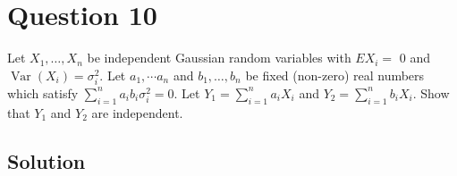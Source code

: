 \section*{Question 10}

Let \( X_{1}, \dots, X_{n} \) be independent Gaussian random variables with \( E X_{i}= \) 0 and \( \operatorname{Var}\left(X_{i}\right)=\sigma_{i}^{2} \).
Let \( a_{1}, \cdots a_{n} \) and \( b_{1}, \dots, b_{n} \) be fixed (non-zero) real numbers which satisfy \( \sum_{i=1}^{n} a_{i} b_{i} \sigma_{i}^{2}=0 \).
Let \( Y_{1}=\sum_{i=1}^{n} a_{i} X_{i} \) and \( Y_{2}=\sum_{i=1}^{n} b_{i} X_{i} \).
Show that \( Y_{1} \) and \( Y_{2} \) are independent.

\subsection*{Solution}
